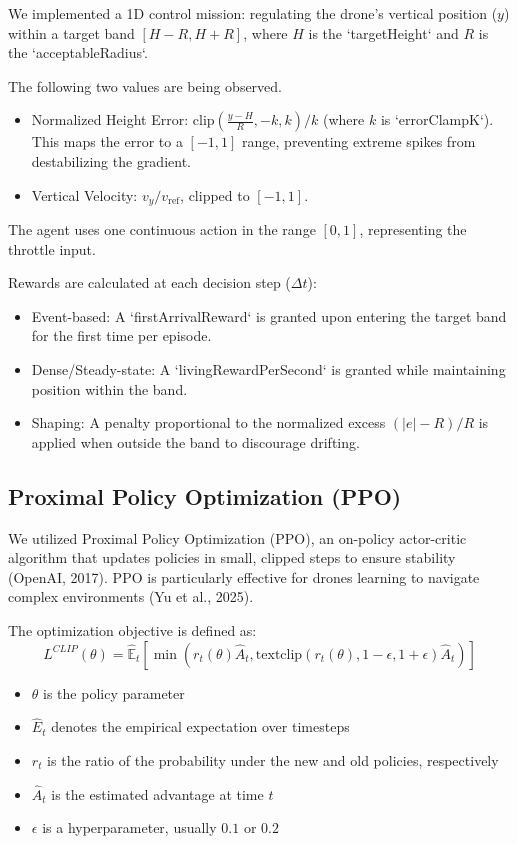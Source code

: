 We implemented a 1D control mission: regulating the drone's vertical position ($y$) within a target band $[H - R, H + R]$, where $H$ is the `targetHeight` and $R$ is the `acceptableRadius`.

The following two values are being observed.

\begin{itemize}
    \item Normalized Height Error: $\text{clip}(\frac{y - H}{R}, -k, k) / k$ (where $k$ is `errorClampK`). This maps the error to a $[-1, 1]$ range, preventing extreme spikes from destabilizing the gradient.
    \item Vertical Velocity: $v_y / v_{\text{ref}}$, clipped to $[-1, 1]$.
\end{itemize}

The agent uses one continuous action in the range $[0, 1]$, representing the throttle input.

Rewards are calculated at each decision step ($\Delta t$):

\begin{itemize}
    \item Event-based: A `firstArrivalReward` is granted upon entering the target band for the first time per episode.
    \item Dense/Steady-state: A `livingRewardPerSecond` is granted while maintaining position within the band.
    \item Shaping: A penalty proportional to the normalized excess $(|e|-R)/R$ is applied when outside the band to discourage drifting.
\end{itemize}

\subsection{Proximal Policy Optimization (PPO)}


We utilized Proximal Policy Optimization (PPO), an on-policy actor-critic algorithm that updates policies in small, clipped steps to ensure stability (OpenAI, 2017). PPO is particularly effective for drones learning to navigate complex environments (Yu et al., 2025).

The optimization objective is defined as:
$$L^{CLIP}(\theta) = \hat{\mathbb{E}}_t [ \min(r_t(\theta)\hat{A}_t, \text{text{clip}}(r_t(\theta), 1-\epsilon, 1+\epsilon)\hat{A}_t) ]$$


\begin{itemize}
    \item $\theta$ is the policy parameter
    \item $\hat{E}_t$ denotes the empirical expectation over timesteps
    \item $r_t$ is the ratio of the probability under the new and old policies, respectively
    \item $\hat{A}_t$ is the estimated advantage at time $t$
    \item $\epsilon$ is a hyperparameter, usually $0.1$ or $0.2$
\end{itemize}

